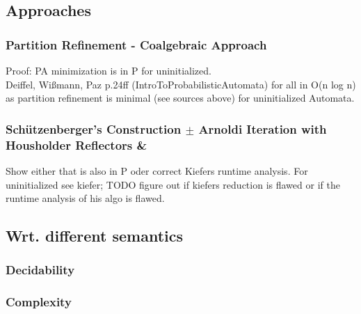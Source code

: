 \documentclass{article} %
\begin{document}
        \subsection{Approaches}
            \subsubsection{Partition Refinement - Coalgebraic Approach}
            Proof: PA minimization is in P for uninitialized. \\
            Deiffel, Wißmann, Paz p.24ff (IntroToProbabilisticAutomata)
            for all in O(n log n) as partition refinement is minimal (see sources above) for uninitialized Automata. \\
        
            \subsubsection{Schützenberger's Construction $\pm$ Arnoldi Iteration with Housholder Reflectors \& }
            Show either that is also in P oder correct Kiefers runtime analysis.
            For uninitialized see kiefer; TODO figure out if kiefers reduction is flawed or if the runtime analysis of his algo is flawed.
            
        \subsection{Wrt. different semantics}
            \subsubsection{Decidability}
            
            \subsubsection{Complexity}



\printbibliography
\end{document}
